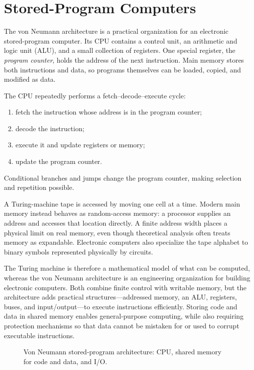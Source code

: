 \documentclass[11pt]{article}
\begin{document}
\section{Stored-Program Computers}

The von Neumann architecture is a practical organization for an electronic
stored-program computer. Its CPU contains a control unit, an arithmetic and
logic unit (ALU), and a small collection of registers. One special register,
the \emph{program counter}, holds the address of the next instruction. Main
memory stores both instructions and data, so programs themselves can be loaded,
copied, and modified as data.

The CPU repeatedly performs a fetch--decode--execute cycle:
\begin{enumerate}
  \item fetch the instruction whose address is in the program counter;
  \item decode the instruction;
  \item execute it and update registers or memory;
  \item update the program counter.
\end{enumerate}
Conditional branches and jumps change the program counter, making selection and repetition possible.

A Turing-machine tape is accessed by moving one cell at a time. Modern main
memory instead behaves as random-access memory: a processor supplies an address
and accesses that location directly. A finite address width places a physical
limit on real memory, even though theoretical analysis often treats memory as
expandable. Electronic computers also specialize the tape alphabet to binary
symbols represented physically by circuits.

The Turing machine is therefore a mathematical model of what can be computed,
whereas the von Neumann architecture is an engineering organization for
building electronic computers. Both combine finite control with writable
memory, but the architecture adds practical structures---addressed memory, an
ALU, registers, buses, and input/output---to execute instructions efficiently.
Storing code and data in shared memory enables general-purpose computing, while
also requiring protection mechanisms so that data cannot be mistaken for or
used to corrupt executable instructions.

\begin{figure}[htbp]
  \centering
  
  \caption{Von Neumann stored-program architecture: CPU, shared memory for code and data, and I/O.}
\end{figure}
\end{document}
